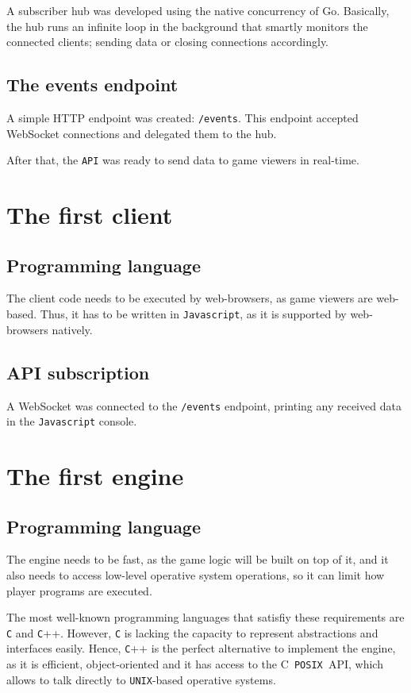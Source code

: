\documentclass[a4paper,11pt,titlepage,abstract,numbers=noenddot,automark,mnsy,intlimits,rgb,dvipsnames]{report}
\begin{document}
A subscriber hub was developed using the native concurrency of Go. Basically, the hub runs an infinite loop in the
background that smartly monitors the connected clients; sending data or closing connections accordingly.
\subsection{The events endpoint}
A simple HTTP endpoint was created: \texttt{/events}. This endpoint accepted WebSocket connections and delegated them to the
hub.

After that, the \texttt{API} was ready to send data to game viewers in real-time.
\section{The first client}
\subsection{Programming language}
The client code needs to be executed by web-browsers, as game viewers are web-based.
Thus, it has to be written in \texttt{Javascript}, as it is supported by web-browsers natively.
\subsection{API subscription}
A WebSocket was connected to the \texttt{/events} endpoint, printing any received data in the \texttt{Javascript} console.
\section{The first engine}
\subsection{Programming language}
The engine needs to be fast, as the game logic will be built on top of it, and it also needs to access
low-level operative system operations, so it can limit how player programs are executed.

The most well-known programming languages that satisfiy these requirements are \texttt{C} and \texttt{C}++. However, \texttt{C}  is lacking
the capacity to represent abstractions and interfaces easily. Hence, \texttt{C}++ is the perfect alternative to implement
the engine, as it is efficient, object-oriented and it has access to the \texttt{}C\texttt{ POSIX }API\texttt{}, which allows to talk
directly to \texttt{UNIX}-based operative systems.
\end{document}
